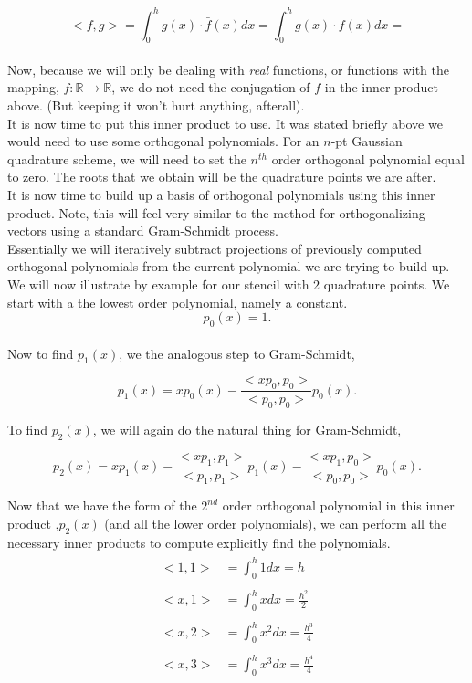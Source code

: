 \documentclass[paper=a4, fontsize=11pt]{scrartcl} %
\numberwithin{equation}{section} %
\numberwithin{figure}{section} %
\numberwithin{table}{section} %
\begin{document}
$$<f,g> = \int_{0}^h g(x) \cdot \bar{f}(x) dx = \int_{0}^h g(x) \cdot f(x) dx =$$\\

Now, because we will only be dealing with \emph{real} functions, or functions with the mapping, $f:\mathbb{R}\rightarrow\mathbb{R}$, we do not need the conjugation of $f$ in the inner product above. (But keeping it won't hurt anything, afterall).\\

It is now time to put this inner product to use. It was stated briefly above we would need to use some orthogonal polynomials. For an $n$-pt Gaussian quadrature scheme, we will need to set the $n^{th}$ order orthogonal polynomial equal to zero. The roots that we obtain will be the quadrature points we are after.\\

It is now time to build up a basis of orthogonal polynomials using this inner product. Note, this will feel very similar to the method for orthogonalizing vectors using a standard Gram-Schmidt process.\\

Essentially we will iteratively subtract projections of previously computed orthogonal polynomials from the current polynomial we are trying to build up. We will now illustrate by example for our stencil with $2$ quadrature points. We start with a the lowest order polynomial, namely a constant.\\

$$p_0(x) = 1.$$\\

Now to find $p_1(x)$, we the analogous step to Gram-Schmidt, 

$$p_1(x) = xp_0(x) - \frac{ <xp_0,p_0>   }{ <p_0,p_0>} p_0(x).$$

To find $p_2(x)$, we will again do the natural thing for Gram-Schmidt,

$$p_2(x) = xp_1(x) -  \frac{ <xp_1,p_1>   }{ <p_1,p_1>} p_1(x) -  \frac{ <xp_1,p_0>   }{ <p_0,p_0>} p_0(x).$$

Now that we have the form of the $2^{nd}$ order orthogonal polynomial in this inner product ,$p_2(x)$ (and all the lower order polynomials), we can perform all the necessary inner products to compute explicitly find the polynomials. \\

\begin{align}
\nonumber
\begin{split}
<1,1> &= \int_0^h 1 dx = h \\ \\
<x,1> &= \int_0^h x dx = \frac{h^2}{2} \\ \\
<x,2> &= \int_0^h x^2 dx = \frac{h^3}{4} \\ \\
<x,3> &= \int_0^h x^3 dx = \frac{h^4}{4} \\ \\
\end{split}
\end{align}
\end{document}
